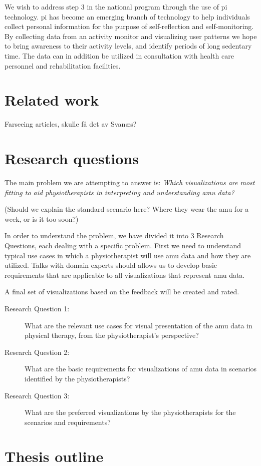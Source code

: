 We wish to address step 3 in the national program through the use of \gls{pi} technology. \gls{pi} has become an emerging branch of technology to help individuals collect personal information for the purpose of self-reflection and self-monitoring. By collecting data from an activity monitor and visualizing user patterns we hope to bring awareness to their activity levels, and identify periods of long sedentary time. The data can in addition be utilized in consultation with health care personnel and rehabilitation facilities.

\section{Related work}
Farseeing articles, skulle få det av Svanæs?

\section{Research questions}
The main problem we are attempting to answer is: \textit{Which visualizations are most fitting to aid physiotherapists in interpreting and understanding \gls{amu} data?}

(Should we explain the standard scenario here? Where they wear the \gls{amu} for a week, or is it too soon?)

In order to understand the problem, we have divided it into 3 Research Questions, each dealing with a specific problem. First we need to understand typical use cases in which a physiotherapist will use \gls{amu} data and how they are utilized. Talks with domain experts should allows us to develop basic requirements that are applicable to all visualizations that represent \gls{amu} data.

 A final set of visualizations based on the feedback will be created and rated.

\begin{description}
\item[Research Question 1:] What are the relevant use cases for visual presentation of the \gls{amu} data in physical therapy, from the physiotherapist's perspective?

\item[Research Question 2:] What are the basic requirements for visualizations of \gls{amu} data in scenarios identified by the physiotherapists?

\item[Research Question 3:] What are the preferred visualizations by the physiotherapists for the scenarios and requirements?
\end{description}

\section{Thesis outline}
